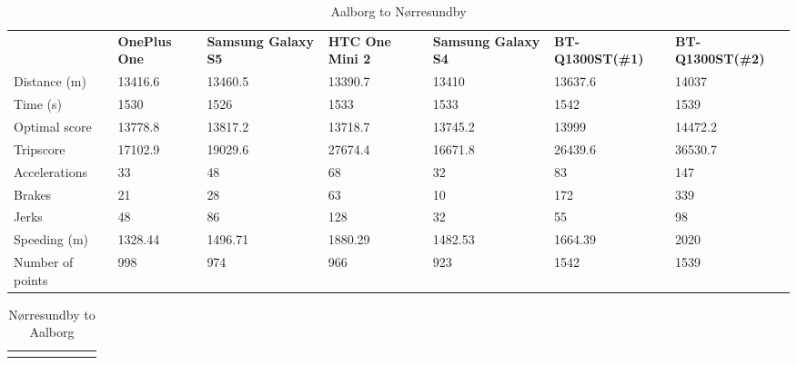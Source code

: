 \begin{landscape}
\begin{table*}[h]
\hspace{-2.5in}
\begin{minipage}{0.95\textwidth}
\caption{Aalborg to Nørresundby}
\label{my-label}
\begin{tabular}{|l|llllll|}
\hline
\rowcolor{tablegreen}

                 & \textbf{OnePlus One} & \textbf{Samsung Galaxy S5} & \textbf{HTC One Mini 2} & \textbf{Samsung Galaxy S4} & \textbf{BT-Q1300ST(\#1)} & \textbf{BT-Q1300ST(\#2)} \\
Distance (m)     & 13416.6     & 13460.5           & 13390.7        & 13410             & 13637.6         & 14037           \\
Time (s)         & 1530        & 1526              & 1533           & 1533              & 1542            & 1539            \\
Optimal score    & 13778.8     & 13817.2           & 13718.7        & 13745.2           & 13999           & 14472.2         \\
Tripscore        & 17102.9     & 19029.6           & 27674.4        & 16671.8           & 26439.6         & 36530.7         \\
Accelerations    & 33          & 48                & 68             & 32                & 83              & 147             \\
Brakes           & 21          & 28                & 63             & 10                & 172             & 339             \\
Jerks            & 48          & 86                & 128            & 32                & 55              & 98              \\
Speeding (m)     & 1328.44     & 1496.71           & 1880.29        & 1482.53           & 1664.39         & 2020            \\
Number of points & 998         & 974               & 966            & 923               & 1542            & 1539            \\\hline
\end{tabular}
\end{minipage}
\end{table*}
\vspace{10 mm}
\begin{table*}[h]
\hspace{-2.5in}
\begin{minipage}{0.95\textwidth}
\caption{Nørresundby to Aalborg}
\label{my-label}
\begin{tabular}{|l|llllll|}
\hline
\rowcolor{tablegreen}


\end{tabular}
\end{minipage}
\end{table*}
\end{landscape}
